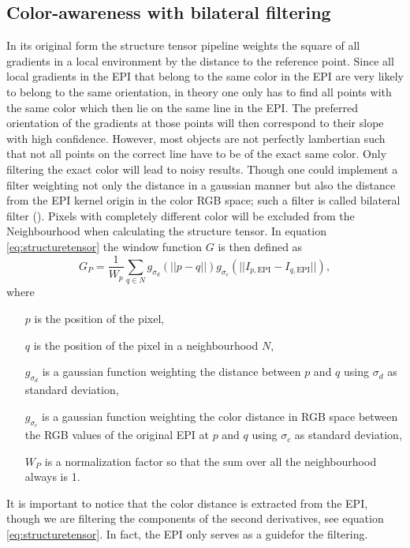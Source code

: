 \documentclass  [
  paper    = a4,
  BCOR     = 10mm,
  twoside,
  fontsize = 12pt,
  fleqn,
  toc      = bibnumbered,
  toc      = listofnumbered,
  numbers  = noendperiod,
  headings = normal,
  listof   = leveldown,
  version  = 3.03
]                                       {scrreprt}
\begin{document}
 \subsection{Color-awareness with bilateral filtering}
 \label{sec:bilateral}
 In its original form the structure tensor pipeline weights the square of all gradients in a local environment by the distance to the reference point. Since all local gradients in the EPI that belong to the same color in the EPI are very likely to belong to the same orientation, in theory one only has to find all points with the same color which then lie on the same line in the EPI. The preferred orientation of the gradients at those points will then correspond to their slope with high confidence. However, most objects are not perfectly lambertian such that not all points on the correct line have to be of the exact same color. Only filtering the exact color will lead to noisy results. Though one could implement a filter weighting not only the distance in a gaussian manner but also the distance from the  EPI kernel origin in the color RGB space; such a filter is called \glqq bilateral filter \grqq (\cite{tomasi1998bilateral}). Pixels with completely different color will be excluded from the Neighbourhood when calculating the structure tensor. In equation \ref{eq:structuretensor} the window function $G$ is then defined as 
 \begin{equation}\label{eq:bilateral}
 G_P = \frac{1}{W_p}\sum_{q\in N} g_{\sigma_d}(||p-q||) g_{\sigma_c}(||I_{p, \text{EPI}}-I_{q, \text{EPI}}||),
 \end{equation}
 where
 \begin{itemize}
 	\item[$p$] is the position of the pixel,
 	\item[$q$] is the position of the pixel in a neighbourhood $N$,
 	\item[ $g_{\sigma_d}$] is a gaussian function weighting the distance between $p$ and $q$ using $\sigma_d$ as standard deviation,
 	\item[ $g_{\sigma_c}$] is a gaussian function weighting the color distance in RGB space between the  RGB values of the original EPI at $p$ and $q$ using $\sigma_c$ as standard deviation,
 	\item[$W_P$] is a normalization factor so that the sum over all the neighbourhood always is 1. 
 \end{itemize}


It is important to notice that the color distance is extracted from the EPI, though we are filtering the components of the second derivatives, see equation \ref{eq:structuretensor}. In fact, the EPI only serves as a \glqq guide\grqq for the filtering.
\end{document}
